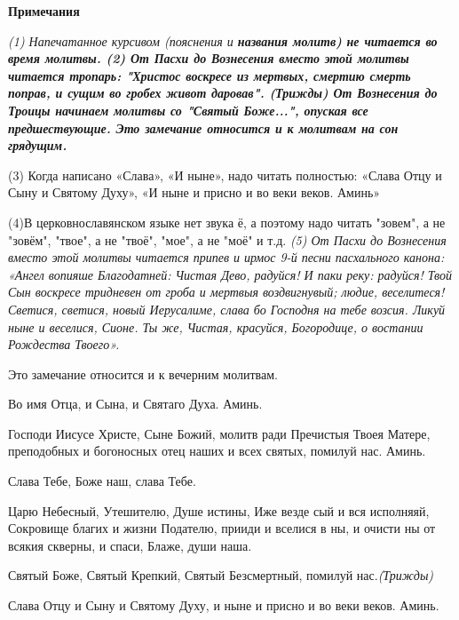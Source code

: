 \medskip


\bfseries Примечания\normalfont{}


\itshape (1)\normalfont{} Напечатанное курсивом (\itshape пояснения\normalfont{} и \bfseries названия молитв\normalfont{}) не читается во время молитвы.
  \itshape (2)\normalfont{} От Пасхи до Вознесения вместо этой молитвы читается тропарь: "Христос воскресе из мертвых, смертию смерть поправ, и сущим во гробех живот даровав". (Трижды) От Вознесения до Троицы начинаем молитвы со "Святый Боже...", опуская все предшествующие. 
Это замечание относится и к молитвам на сон грядущим.\itshape 


(3)\normalfont{} Когда написано «Слава», «И ныне», надо читать полностью: «Слава Отцу и Сыну и Святому Духу», «И ныне и присно и во веки веков. Аминь»\itshape 


(4)\normalfont{}В церковнославянском языке нет звука ё, а поэтому надо читать "зовем", а не "зовём", "твое", а не "твоё", "мое", а не "моё" и т.д. \itshape 
(5)\normalfont{} От Пасхи до Вознесения вместо этой молитвы читается припев и ирмос 9-й песни пасхального канона: 
«Ангел вопияше Благодатней: Чистая Дево, радуйся! И паки реку: радуйся! Твой Сын воскресе тридневен от гроба и мертвыя воздвигнувый; людие, веселитеся! 
Светися, светися, новый Иерусалиме, слава бо Господня на тебе возсия. Ликуй ныне и веселися, Сионе. Ты же, Чистая, красуйся, Богородице, о востании Рождества Твоего».


Это замечание относится и к вечерним молитвам. 

\mychapterending

 
Во имя Отца, и Сына, и Святаго Духа. Аминь.


Господи Иисусе Христе, Сыне Божий, молитв ради Пречистыя Твоея Матере, преподобных и богоносных отец наших и всех святых, помилуй нас. Аминь.


Слава Тебе, Боже наш, слава Тебе.


Царю Небесный, Утешителю, Душе истины, Иже везде сый и вся исполняяй, Сокровище благих и жизни Подателю, прииди и вселися в ны, и очисти ны от всякия скверны, и спаси, Блаже, души наша.


Святый Боже, Святый Крепкий, Святый Безсмертный, помилуй нас.\itshape  (Трижды)\normalfont{}


Слава Отцу и Сыну и Святому Духу, и ныне и присно и во веки веков. Аминь.


